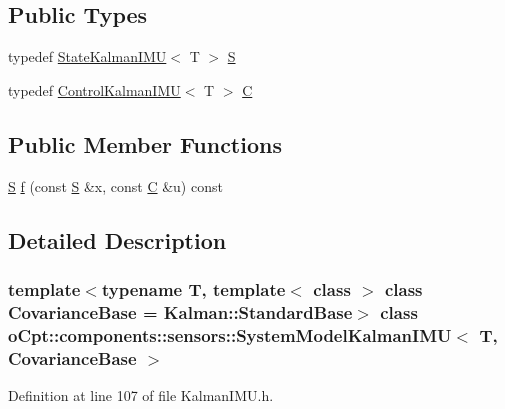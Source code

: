 \subsection*{Public Types}
\begin{DoxyCompactItemize}
\item 
typedef \hyperlink{classo_cpt_1_1components_1_1sensors_1_1_state_kalman_i_m_u}{State\+Kalman\+I\+MU}$<$ T $>$ \hyperlink{classo_cpt_1_1components_1_1sensors_1_1_system_model_kalman_i_m_u_a7dde4d4af9085109c0e3021aa38f42bc}{S}
\item 
typedef \hyperlink{classo_cpt_1_1components_1_1sensors_1_1_control_kalman_i_m_u}{Control\+Kalman\+I\+MU}$<$ T $>$ \hyperlink{classo_cpt_1_1components_1_1sensors_1_1_system_model_kalman_i_m_u_a5ed9fbeaeaa5a91116615f01a44b7c78}{C}
\end{DoxyCompactItemize}
\subsection*{Public Member Functions}
\begin{DoxyCompactItemize}
\item 
\hyperlink{classo_cpt_1_1components_1_1sensors_1_1_system_model_kalman_i_m_u_a7dde4d4af9085109c0e3021aa38f42bc}{S} \hyperlink{classo_cpt_1_1components_1_1sensors_1_1_system_model_kalman_i_m_u_ac471dd93069d4b98814254c0bc4ee7ac}{f} (const \hyperlink{classo_cpt_1_1components_1_1sensors_1_1_system_model_kalman_i_m_u_a7dde4d4af9085109c0e3021aa38f42bc}{S} \&x, const \hyperlink{classo_cpt_1_1components_1_1sensors_1_1_system_model_kalman_i_m_u_a5ed9fbeaeaa5a91116615f01a44b7c78}{C} \&u) const
\end{DoxyCompactItemize}


\subsection{Detailed Description}
\subsubsection*{template$<$typename T, template$<$ class $>$ class Covariance\+Base = Kalman\+::\+Standard\+Base$>$\newline
class o\+Cpt\+::components\+::sensors\+::\+System\+Model\+Kalman\+I\+M\+U$<$ T, Covariance\+Base $>$}



Definition at line 107 of file Kalman\+I\+M\+U.\+h.



